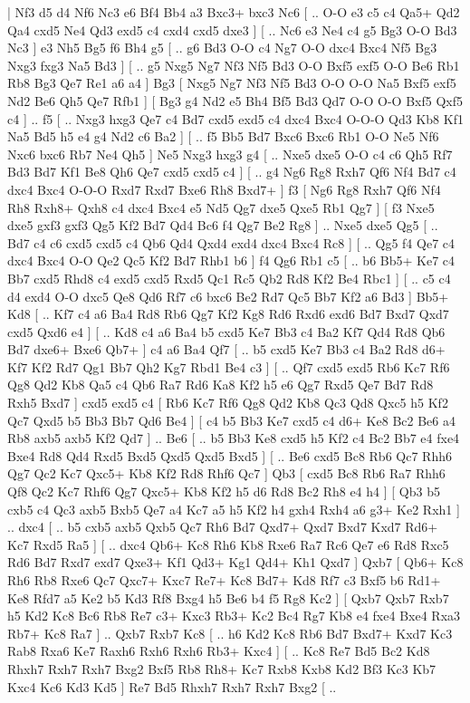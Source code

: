 \makegametitle 
|   Nf3   d5    d4   Nf6    Nc3   e6    Bf4   Bb4    a3   Bxc3+    bxc3   Nc6 [ .. O-O  e3 c5  c4 Qa5+  Qd2 Qa4  cxd5 Ne4  Qd3 exd5  c4 cxd4  cxd5 dxe3   ]  [ .. Nc6  e3 Ne4  c4 g5  Bg3 O-O  Bd3 Nc3   ]  e3   Nh5    Bg5   f6    Bh4   g5 [ .. g6  Bd3 O-O  c4 Ng7  O-O dxc4  Bxc4 Nf5  Bg3 Nxg3  fxg3 Na5  Bd3   ]  [ .. g5  Nxg5 Ng7  Nf3 Nf5  Bd3 O-O  Bxf5 exf5  O-O Be6  Rb1 Rb8  Bg3 Qe7  Re1 a6  a4   ]  Bg3 [  Nxg5 Ng7  Nf3 Nf5  Bd3 O-O  O-O Na5  Bxf5 exf5  Nd2 Be6  Qh5 Qe7  Rfb1   ]  [  Bg3 g4  Nd2 e5  Bh4 Bf5  Bd3 Qd7  O-O O-O  Bxf5 Qxf5  c4   ] .. f5    [ .. Nxg3  hxg3 Qe7  c4 Bd7  cxd5 exd5  c4 dxc4  Bxc4 O-O-O  Qd3 Kb8  Kf1 Na5  Bd5 h5  e4 g4  Nd2 c6  Ba2   ]  [ .. f5  Bb5 Bd7  Bxc6 Bxc6  Rb1 O-O  Ne5 Nf6  Nxc6 bxc6  Rb7 Ne4  Qh5   ]  Ne5   Nxg3    hxg3   g4 [ .. Nxe5  dxe5 O-O  c4 c6  Qh5 Rf7  Bd3 Bd7  Kf1 Be8  Qh6 Qe7  cxd5 cxd5  c4   ]  [ .. g4  Ng6 Rg8  Rxh7 Qf6  Nf4 Bd7  c4 dxc4  Bxc4 O-O-O  Rxd7 Rxd7  Bxe6 Rh8  Bxd7+   ]  f3 [  Ng6 Rg8  Rxh7 Qf6  Nf4 Rh8  Rxh8+ Qxh8  c4 dxc4  Bxc4 e5  Nd5 Qg7  dxe5 Qxe5  Rb1 Qg7   ]  [  f3 Nxe5  dxe5 gxf3  gxf3 Qg5  Kf2 Bd7  Qd4 Bc6  f4 Qg7  Be2 Rg8   ] .. Nxe5    dxe5   Qg5 [ .. Bd7  c4 c6  cxd5 cxd5  c4 Qb6  Qd4 Qxd4  exd4 dxc4  Bxc4 Rc8   ]  [ .. Qg5  f4 Qe7  c4 dxc4  Bxc4 O-O  Qe2 Qc5  Kf2 Bd7  Rhb1 b6   ]  f4   Qg6    Rb1   c5 [ .. b6  Bb5+ Ke7  c4 Bb7  cxd5 Rhd8  c4 exd5  cxd5 Rxd5  Qc1 Rc5  Qb2 Rd8  Kf2 Be4  Rbc1   ]  [ .. c5  c4 d4  exd4 O-O  dxc5 Qe8  Qd6 Rf7  c6 bxc6  Be2 Rd7  Qc5 Bb7  Kf2 a6  Bd3   ]  Bb5+   Kd8 [ .. Kf7  c4 a6  Ba4 Rd8  Rb6 Qg7  Kf2 Kg8  Rd6 Rxd6  exd6 Bd7  Bxd7 Qxd7  cxd5 Qxd6  e4   ]  [ .. Kd8  c4 a6  Ba4 b5  cxd5 Ke7  Bb3 c4  Ba2 Kf7  Qd4 Rd8  Qb6 Bd7  dxe6+ Bxe6  Qb7+   ]  c4   a6    Ba4   Qf7 [ .. b5  cxd5 Ke7  Bb3 c4  Ba2 Rd8  d6+ Kf7  Kf2 Rd7  Qg1 Bb7  Qh2 Kg7  Rbd1 Be4  c3   ]  [ .. Qf7  cxd5 exd5  Rb6 Kc7  Rf6 Qg8  Qd2 Kb8  Qa5 c4  Qb6 Ra7  Rd6 Ka8  Kf2 h5  e6 Qg7  Rxd5 Qe7  Bd7 Rd8  Rxh5 Bxd7   ]  cxd5   exd5    c4 [  Rb6 Kc7  Rf6 Qg8  Qd2 Kb8  Qc3 Qd8  Qxc5 h5  Kf2 Qc7  Qxd5 b5  Bb3 Bb7  Qd6 Be4   ]  [  c4 b5  Bb3 Ke7  cxd5 c4  d6+ Ke8  Bc2 Be6  a4 Rb8  axb5 axb5  Kf2 Qd7   ] .. Be6 [ .. b5  Bb3 Ke8  cxd5 h5  Kf2 c4  Bc2 Bb7  e4 fxe4  Bxe4 Rd8  Qd4 Rxd5  Bxd5 Qxd5  Qxd5 Bxd5   ]  [ .. Be6  cxd5 Bc8  Rb6 Qc7  Rhh6 Qg7  Qc2 Kc7  Qxc5+ Kb8  Kf2 Rd8  Rhf6 Qc7   ]  Qb3 [  cxd5 Bc8  Rb6 Ra7  Rhh6 Qf8  Qc2 Kc7  Rhf6 Qg7  Qxc5+ Kb8  Kf2 h5  d6 Rd8  Bc2 Rh8  e4 h4   ]  [  Qb3 b5  cxb5 c4  Qc3 axb5  Bxb5 Qe7  a4 Kc7  a5 h5  Kf2 h4  gxh4 Rxh4  a6 g3+  Ke2 Rxh1   ] .. dxc4 [ .. b5  cxb5 axb5  Qxb5 Qc7  Rh6 Bd7  Qxd7+ Qxd7  Bxd7 Kxd7  Rd6+ Kc7  Rxd5 Ra5   ]  [ .. dxc4  Qb6+ Kc8  Rh6 Kb8  Rxe6 Ra7  Rc6 Qe7  e6 Rd8  Rxc5 Rd6  Bd7 Rxd7  exd7 Qxe3+  Kf1 Qd3+  Kg1 Qd4+  Kh1 Qxd7   ]  Qxb7 [  Qb6+ Kc8  Rh6 Rb8  Rxe6 Qc7  Qxc7+ Kxc7  Re7+ Kc8  Bd7+ Kd8  Rf7 c3  Bxf5 b6  Rd1+ Ke8  Rfd7 a5  Ke2 b5  Kd3 Rf8  Bxg4 h5  Be6 b4  f5 Rg8  Kc2   ]  [  Qxb7 Qxb7  Rxb7 h5  Kd2 Kc8  Bc6 Rb8  Re7 c3+  Kxc3 Rb3+  Kc2 Bc4  Rg7 Kb8  e4 fxe4  Bxe4 Rxa3  Rb7+ Kc8  Ra7   ] .. Qxb7    Rxb7   Kc8 [ .. h6  Kd2 Kc8  Rb6 Bd7  Bxd7+ Kxd7  Kc3 Rab8  Rxa6 Ke7  Raxh6 Rxh6  Rxh6 Rb3+  Kxc4   ]  [ .. Kc8  Re7 Bd5  Bc2 Kd8  Rhxh7 Rxh7  Rxh7 Bxg2  Bxf5 Rb8  Rh8+ Kc7  Rxb8 Kxb8  Kd2 Bf3  Kc3 Kb7  Kxc4 Kc6  Kd3 Kd5   ]  Re7   Bd5    Rhxh7   Rxh7    Rxh7   Bxg2 [ .. 